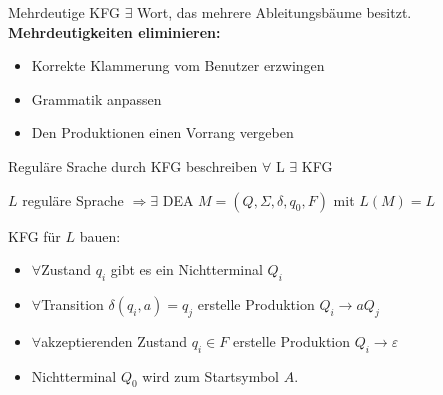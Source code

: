 \begin{concept}{Mehrdeutige KFG} $\exists $ Wort, das mehrere Ableitungsbäume besitzt.\\
    \textbf{Mehrdeutigkeiten eliminieren:}
    \begin{itemize}
    \item Korrekte Klammerung vom Benutzer erzwingen
    \item Grammatik anpassen
    \item Den Produktionen einen Vorrang vergeben
    \end{itemize}
\end{concept}

\begin{KR}{Reguläre Srache durch KFG beschreiben} $\forall$ L $\exists$ KFG

    $L$ reguläre Sprache $\Rightarrow \exists$ DEA $M=\left(Q, \Sigma, \delta, q_{0}, F\right)$ mit $L(M)=L$
    
    \vspace*{1mm}

    KFG für $L$ bauen:
    \begin{itemize}
    \item $\forall$Zustand $q_{i}$ gibt es ein Nichtterminal $Q_{i}$
    \item $\forall$Transition $\delta\left(q_{i}, a\right)=q_{j}$ erstelle Produktion $Q_{i} \rightarrow a Q_{j}$
    \item $\forall$akzeptierenden Zustand $q_{i} \in F$ erstelle Produktion $Q_{i} \rightarrow \varepsilon$
    \item Nichtterminal $Q_{0}$ wird zum Startsymbol $A$.
    \end{itemize}
\end{KR}